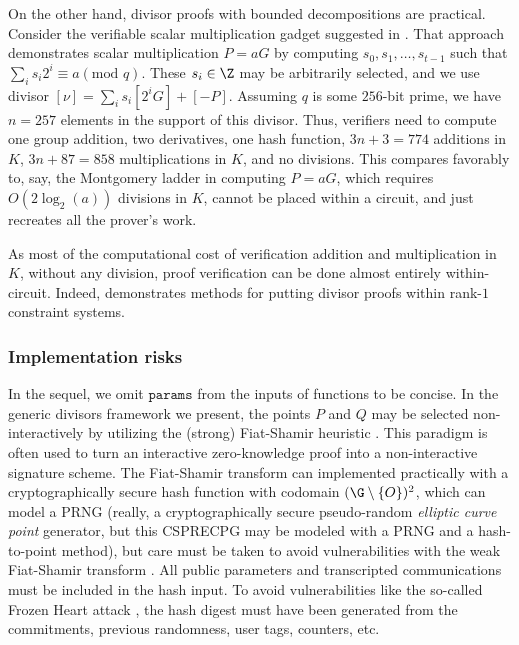 \documentclass[11pt,letterpaper]{article}
\theoremstyle{definition}
\newcommand{\6}{\mathbf}
\newcommand{\7}{\mathcal}
\begin{document}
On the other hand, divisor proofs with bounded decompositions are practical. Consider the verifiable scalar multiplication gadget suggested in \cite{Kayaba}. That approach demonstrates scalar multiplication $P = aG$ by computing $s_0, s_1, \ldots, s_{t-1}$ such that $\sum_i s_i 2^i \equiv a (\text{mod }q)$.  These $s_i \in \Z$ may be arbitrarily selected, and we use divisor $\left[\nu\right] = \sum_i s_i[2^i G] + [-P]$. Assuming $q$ is some $256$-bit prime, we have $n=257$ elements in the support of this divisor. Thus, verifiers need to compute one group addition, two derivatives, one hash function, $3n+3=774$ additions in $K$, $3n+87=858$ multiplications in $K$, and no divisions. This compares favorably to, say, the Montgomery ladder in computing $P = aG$, which requires $O(2\log_2(a))$ divisions in $K$, cannot be placed within a circuit, and just recreates all the prover's work.

As most of the computational cost of verification addition and multiplication in $K$, without any division, proof verification can be done almost entirely within-circuit. Indeed, \cite{Kayaba} demonstrates methods for putting divisor proofs within rank-$1$ constraint systems.

\subsubsection{Implementation risks}


In the sequel, we omit $\texttt{params}$ from the inputs of functions to be concise.
In the generic divisors framework we present, the points $P$ and $Q$ may be selected non-interactively by utilizing the (strong) Fiat-Shamir heuristic \cite{FiatShamir}.
This paradigm is often used to turn an interactive zero-knowledge proof into a non-interactive signature scheme.
The Fiat-Shamir transform can implemented practically with a cryptographically secure hash function with codomain $(\G\setminus\left\{O\right\})^2$, which can model a PRNG (really, a cryptographically secure pseudo-random \textit{elliptic curve point} generator, but this CSPRECPG may be modeled with a PRNG and a hash-to-point method), but care must be taken to avoid vulnerabilities with the weak Fiat-Shamir transform \cite{NHB,BPW,DMWG}. All public parameters and transcripted communications must be included in the hash input.
To avoid vulnerabilities like the so-called Frozen Heart attack \cite{Marvinblog, FH3}, the hash digest must have been generated from the commitments, previous randomness, user tags, counters, etc.
\end{document}
